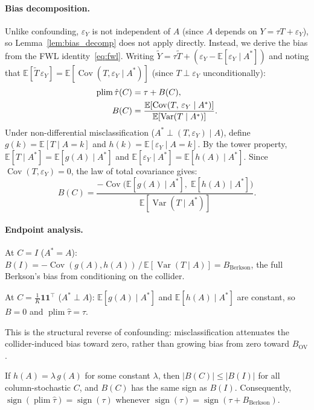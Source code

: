 \paragraph{Bias decomposition.}
Unlike confounding, $\varepsilon_Y$ is not independent of $A$ (since $A$ depends on $Y=\tau T+\varepsilon_Y$), so Lemma~\ref{lem:bias_decomp} does not apply directly.
Instead, we derive the bias from the FWL identity~\eqref{eq:fwl}.
Writing $\tilde{Y}=\tau\tilde{T}+(\varepsilon_Y-\mathbb{E}[\varepsilon_Y\mid A^*])$ and noting that $\mathbb{E}[\tilde{T}\,\varepsilon_Y]=\mathbb{E}[\operatorname{Cov}(T,\varepsilon_Y\mid A^*)]$ (since $T\perp\varepsilon_Y$ unconditionally):
\begin{align}
  \operatorname{plim}\hat\tau(C) &= \tau + B(C),\notag\\
  B(C) &= \frac{\mathbb{E}[\operatorname{Cov}(T,\,\varepsilon_Y\mid A^*)]}{\mathbb{E}[\operatorname{Var}(T\mid A^*)]}.
  \label{eq:bias_col}
\end{align}
Under non-differential misclassification ($A^*\perp(T,\varepsilon_Y)\mid A$), define $g(k)=\mathbb{E}[T\mid A{=}k]$ and $h(k)=\mathbb{E}[\varepsilon_Y\mid A{=}k]$.
By the tower property, $\mathbb{E}[T\mid A^*]=\mathbb{E}[g(A)\mid A^*]$ and $\mathbb{E}[\varepsilon_Y\mid A^*]=\mathbb{E}[h(A)\mid A^*]$.
Since $\operatorname{Cov}(T,\varepsilon_Y)=0$, the law of total covariance gives:
\[
  B(C) = \frac{-\operatorname{Cov}\bigl(\mathbb{E}[g(A)\mid A^*],\;\mathbb{E}[h(A)\mid A^*]\bigr)}{\mathbb{E}[\operatorname{Var}(T\mid A^*)]}.
\]

\paragraph{Endpoint analysis.}
At $C=I$ ($A^*{=}A$):
$B(I) = -\operatorname{Cov}(g(A),h(A))\,/\,\mathbb{E}[\operatorname{Var}(T\mid A)] = B_{\mathrm{Berkson}}$,
the full Berkson's bias from conditioning on the collider.

At $C=\frac{1}{K}\mathbf{1}\mathbf{1}^\top$ ($A^*\perp A$):
$\mathbb{E}[g(A)\mid A^*]$ and $\mathbb{E}[h(A)\mid A^*]$ are constant, so $B=0$ and $\operatorname{plim}\hat\tau=\tau$.

This is the structural reverse of confounding: misclassification attenuates the collider-induced bias toward zero, rather than growing bias from zero toward $B_{\mathrm{OV}}$.

\begin{proposition}
\label{prop:col_prop}
If $h(A)=\lambda\,g(A)$ for some constant $\lambda$, then $|B(C)|\leq|B(I)|$ for all column-stochastic $C$, and $B(C)$ has the same sign as $B(I)$.
Consequently, $\operatorname{sign}(\operatorname{plim}\hat\tau)=\operatorname{sign}(\tau)$ whenever $\operatorname{sign}(\tau)=\operatorname{sign}(\tau+B_{\mathrm{Berkson}})$.
\end{proposition}

